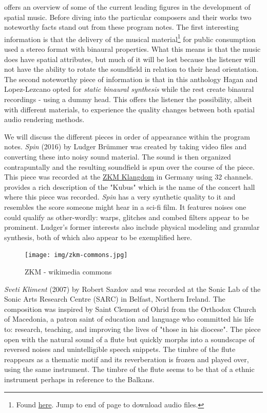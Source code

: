 \cite{hagan2017sound} offers an overview of some of the current leading figures in the development of spatial music. Before diving into the particular composers and their works two noteworthy facts stand out from these program notes. The first interesting information is that the delivery of the musical material\footnote{Found \href{https://muse.jhu.edu/article/656037}{here}. Jump to end of page to download audio files.} for public consumption used a stereo format with binaural properties. What this means is that the music does have spatial attributes, but much of it will be lost because the listener will not have the ability to rotate the soundfield in relation to their head orientation. The second noteworthy piece of information is that in this anthology Hagan and Lopez-Lezcano opted for \textit{static binaural synthesis} while the rest create binaural recordings - using a dummy head. This offers the listener the possibility, albeit with different materials, to experience the quality changes between both spatial audio rendering methods.

We will discuss the different pieces in order of appearance within the program notes. \textit{Spin} (2016) by Ludger Brümmer was created by taking video files and converting these into noisy sound material. The sound is then organized contrapuntally and the resulting soundfield is spun over the course of the piece. This piece was recorded at the \href{https://zkm.de/en}{ZKM Klangdom} in Germany using 32 channels. \cite{ramakrishnan2006zkm} provides a rich description of the "Kubus" which is the name of the concert hall where this piece was recorded. \textit{Spin} has a very synthetic quality to it and resembles the score someone might hear in a sci-fi film. It features noises one could qualify as other-wordly: warps, glitches and combed filters appear to be prominent. Ludger's former interests also include physical modeling and granular synthesis, both of which also appear to be exemplified here. 

\begin{figure}[ht!]%
\centering
\texttt{[image: img/zkm-commons.jpg]} 
\caption{ZKM - wikimedia commons}
\end{figure}

\textit{Sveti Kliment} (2007) by Robert Sazdov and was recorded at the Sonic Lab of the Sonic Arts Research Centre (SARC) in Belfast, Northern Ireland. The composition was inspired by Saint Clement of Ohrid from the Orthodox Church of Macedonia, a patron saint of education and language who committed his life to: research, teaching, and improving the lives of "those in his diocese". The piece open with the natural sound of a flute but quickly morphs into a soundscape of reversed noises and unintelligible speech snippets. The timbre of the flute reappears as a thematic motif and its reverberation is frozen and played over, using the same instrument. The timbre of the flute seems to be that of a ethnic instrument perhaps in reference to the Balkans. 

